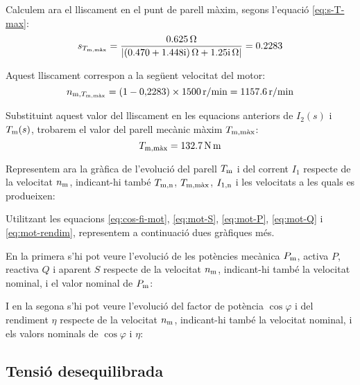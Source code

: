 \begin{exemple}
    Calculem ara el lliscament en el punt de parell màxim, segons l'equació \eqref{eq:s-T-max}:
    \[
        s_{T\ped{m,\text{màx}}} =  \frac{\qty{0,625}{\ohm}}{|\complexqty{0,470+j1,448}{\ohm} + \complexqty{j1,25}{\ohm}|} = \num{0,2283} 
    \]
    
    Aquest lliscament correspon a la següent  velocitat del motor:
    \[
    	n_{\text{m},T_\mathrm{m,\text{màx}}} = (1 - 0{,}2283) \times \qty{1500}{r/min} = \qty{1157,6}{r/min}
    \]
    
  Substituint aquest valor del lliscament en les equacions anteriors de $I_2(s)$  i $T_\mathrm{m}(s)$, trobarem el valor del parell mecànic màxim  $T_\mathrm{m,\text{màx}}$:
  \[
 	T_\mathrm{m,\text{màx}} = \qty{132,7}{N.m}
  \]


    Representem ara la gràfica de l'evolució del parell $T_\mathrm{m}$ i del corrent $I_1$ respecte de la velocitat $n_\mathrm{m}$, indicant-hi també $T_\mathrm{m,n}$, $T_\mathrm{m,\text{màx}}$, $I_\mathrm{1,n}$ i les velocitats a les quals es produeixen:
    \begin{center}
        \fontsize{10pt}{11pt}\selectfont
        
    \end{center}

	Utilitzant les equacions \eqref{eq:cos-fi-mot}, \eqref{eq:mot-S}, \eqref{eq:mot-P}, \eqref{eq:mot-Q} i \eqref{eq:mot-rendim}, representem a continuació dues gràfiques més.
	
	  En la primera s'hi pot veure  l'evolució de les potències mecànica $P_\mathrm{m}$, activa  $P$, reactiva $Q$ i aparent $S$ respecte de la velocitat $n_\mathrm{m}$, indicant-hi també la   velocitat nominal, i el valor nominal de $P_\mathrm{m}$:
	\begin{center}
		\fontsize{10pt}{11pt}\selectfont
		
	\end{center}	

	I en la segona s'hi pot veure l'evolució del factor de potència $\cos\varphi$ i del rendiment $\eta$ respecte de la velocitat $n_\mathrm{m}$, indicant-hi també la  velocitat nominal, i els valors nominals de $\cos\varphi$ i $\eta$:
	\begin{center}
	\fontsize{10pt}{11pt}\selectfont
	
	\end{center}	

\end{exemple}

\subsection{Tensió desequilibrada}\label{sec:mot-tens-deseq}

